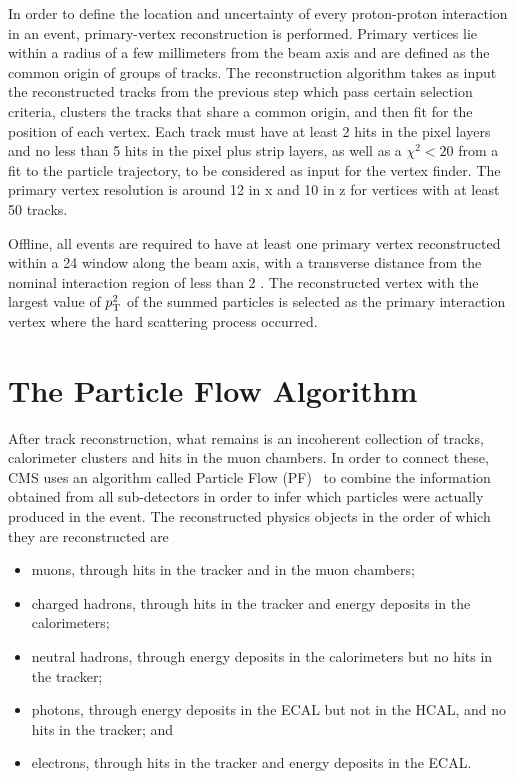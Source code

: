 In order to define the location and uncertainty of every proton-proton interaction in an event, primary-vertex reconstruction is performed. Primary vertices lie within a radius of a few millimeters from the beam axis and are defined as the common origin of groups of tracks.
The reconstruction algorithm takes as input the reconstructed tracks from the previous step which pass certain selection criteria, clusters the tracks that share a common origin, and then fit for the position of each vertex. Each track must have at least 2 hits in the pixel layers and no less than 5 hits in the pixel plus strip layers, as well as a $\chi^2<20$ from a fit to the particle trajectory, to be considered as input for the vertex finder. The primary vertex resolution is around 12 \micron in x and 10 \micron in z for vertices with at least 50 tracks.

Offline, all events are required to have at least one primary vertex reconstructed within a 24 \cm window along the beam axis, with a transverse distance from the nominal interaction region of less than 2 \cm. The reconstructed vertex with the largest value of $p_{\mathrm{T}}^2$ of the summed particles is selected as the primary interaction vertex where the hard scattering process occurred.

\section{The Particle Flow Algorithm}

After track reconstruction, what remains is an incoherent collection of tracks, calorimeter clusters and hits in the muon chambers. In order to connect these, CMS uses an algorithm called Particle Flow (PF)~\cite{1748-0221-12-10-P10003} to combine the information obtained from all sub-detectors in order to infer which particles were actually produced in the event.
The reconstructed physics objects in the order of which they are reconstructed are
\begin{itemize}
  \itemsep0em 
  \item muons, through hits in the tracker and in the muon chambers;
  \item charged hadrons, through hits in the tracker and energy deposits in the calorimeters;
  \item neutral hadrons, through energy deposits in the calorimeters but no hits in the tracker;
  \item photons, through energy deposits in the ECAL but not in the HCAL, and no hits in the tracker; and
  \item electrons, through hits in the tracker and energy deposits in the ECAL.
\end{itemize}

